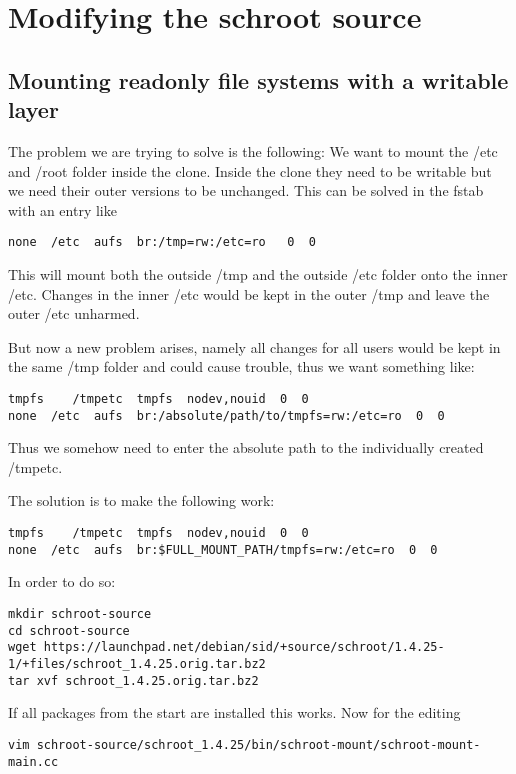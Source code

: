 \documentclass[a4paper]{book}
\begin{document}
\section{Modifying the schroot source}
\subsection{Mounting readonly file systems with a writable layer}
The problem we are trying to solve is the following: We want to mount the /etc
and /root folder inside the clone. Inside the clone they need to be writable
but we need their outer versions to be unchanged.  This can be solved in the
fstab with an entry like

\begin{verbatim}
none  /etc  aufs  br:/tmp=rw:/etc=ro   0  0
\end{verbatim}

This will mount both the outside /tmp and the outside /etc folder onto the
inner /etc. Changes in the inner /etc would be kept in the outer /tmp and leave
the outer /etc unharmed.

But now a new problem arises, namely all changes for all users would be kept in
the same /tmp folder and could cause trouble, thus we want something like:

\begin{verbatim}
tmpfs    /tmpetc  tmpfs  nodev,nouid  0  0
none  /etc  aufs  br:/absolute/path/to/tmpfs=rw:/etc=ro  0  0
\end{verbatim}

Thus we somehow need to enter the absolute path to the individually created /tmpetc.

The solution is to make the following work:

\begin{verbatim}
tmpfs    /tmpetc  tmpfs  nodev,nouid  0  0
none  /etc  aufs  br:$FULL_MOUNT_PATH/tmpfs=rw:/etc=ro  0  0
\end{verbatim}

In order to do so:

\begin{verbatim}
mkdir schroot-source
cd schroot-source
wget https://launchpad.net/debian/sid/+source/schroot/1.4.25-1/+files/schroot_1.4.25.orig.tar.bz2
tar xvf schroot_1.4.25.orig.tar.bz2
\end{verbatim}

If all packages from the start are installed this works.
Now for the editing

\begin{verbatim}
vim schroot-source/schroot_1.4.25/bin/schroot-mount/schroot-mount-main.cc
\end{verbatim}
\end{document}
